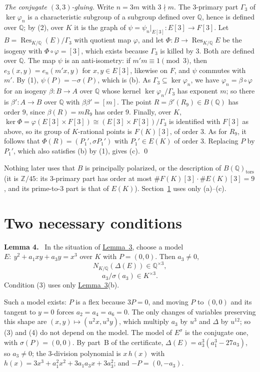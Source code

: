 \documentclass[11pt]{article}
\newenvironment{statement}[1]{\par\medskip\noindent\phantomsection\textbf{#1}\ }{\par\medskip}
\newcommand{\Q}{\mathbb Q}
\newcommand{\Z}{\mathbb Z}
\DeclareMathOperator{\Res}{Res}
\begin{document}
\emph{The conjugate \((3,3)\)-gluing.} Write \(n=3m\) with \(3\nmid m\). The \(3\)-primary part
\(\Gamma_3\) of \(\ker\varphi_n\) is a characteristic subgroup of a subgroup defined over \(\Q\), hence
is defined over \(\Q\); by (2), over \(K\) it is the graph of \(\psi=\psi_n|_{E[3]}:E[3]\to F[3]\). Let
\(B=\Res_{K/\Q}(E)/\Gamma_3\) with quotient map \(\varphi\), and let \(\Phi:B\to\Res_{K/\Q}E\) be the
isogeny with \(\Phi\circ\varphi=[3]\), which exists because \(\Gamma_3\) is killed by \(3\). Both are
defined over \(\Q\). The map \(\psi\) is an anti-isometry: if \(m'm\equiv1\pmod3\), then
\(e_3(x,y)=e_n(m'x,y)\) for \(x,y\in E[3]\), likewise on \(F\), and \(\psi\) commutes with \(m'\). By (1),
\(\psi(P)=-\sigma(P)\), which is (b). As \(\Gamma_3\subseteq\ker\varphi_n\), we have
\(\varphi_n=\beta\circ\varphi\) for an isogeny \(\beta:B\to A\) over \(\Q\) whose kernel
\(\ker\varphi_n/\Gamma_3\) has exponent \(m\); so there is \(\beta':A\to B\) over \(\Q\) with
\(\beta\beta'=[m]\). The point \(R=\beta'(R_9)\in B(\Q)\) has order \(9\), since \(\beta(R)=mR_9\) has order
\(9\). Finally, over \(K\), \(\ker\Phi=\varphi(E[3]\times F[3])\cong(E[3]\times F[3])/\Gamma_3\) is
identified with \(F[3]\) as above, so its group of \(K\)-rational points is \(F(K)[3]\), of order \(3\).
As for \(R_9\), it follows that \(\Phi(R)=(P_1',\sigma P_1')\) with \(P_1'\in E(K)\) of order \(3\).
Replacing \(P\) by \(P_1'\), which also satisfies (b) by (1), gives (c). \qed

\medskip
Nothing later uses that \(B\) is principally polarized, or the description of \(B(\Q)_{\mathrm{tors}}\)
(it is \(\Z/45\): its \(3\)-primary part has order at most \(\#F(K)[3]\cdot\#E(K)[3]=9\), and its
prime-to-\(3\) part is that of \(E(K)\)). Section~\ref{conditions} uses only (a)--(c).

\section{Two necessary conditions}\label{conditions}

\begin{statement}{Lemma 4.}\label{lemma-conditions}
In the situation of \hyperref[lemma-parents]{Lemma~3}, choose a model
\(E:\ y^2+a_1xy+a_3y=x^3\) over \(K\) with \(P=(0,0)\). Then \(a_3\neq0\),
\[N_{K/\Q}(\Delta(E))\in\Q^{\times3},\tag{3}\]
\[a_3/\sigma(a_3)\in K^{\times3}.\tag{4}\]
Condition (3) uses only \hyperref[lemma-parents]{Lemma~3}(b).
\end{statement}

Such a model exists: \(P\) is a flex because \(3P=0\), and moving \(P\) to \((0,0)\) and its tangent
to \(y=0\) forces \(a_2=a_4=a_6=0\). The only changes of variables preserving this shape are
\((x,y)\mapsto(u^2x,u^3y)\), which multiply \(a_3\) by \(u^3\) and \(\Delta\) by \(u^{12}\); so (3) and
(4) do not depend on the model. The model of \(E^\sigma\) is the conjugate one, with \(\sigma(P)=(0,0)\).
By part~B of the certificate, \(\Delta(E)=a_3^3(a_1^3-27a_3)\), so \(a_3\neq0\); the
\(3\)-division polynomial is \(x\,h(x)\) with \(h(x)=3x^3+a_1^2x^2+3a_1a_3x+3a_3^2\); and
\(-P=(0,-a_3)\).
\end{document}
